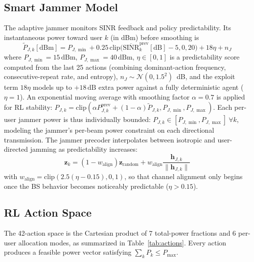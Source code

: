 \documentclass[journal,twocolumn]{IEEEtran}
\newcommand{\vect}[1]{\mathbf{#1}}
\begin{document}
\subsection{Smart Jammer Model}

The adaptive jammer monitors SINR feedback and policy predictability. Its instantaneous power toward user $k$ (in dBm) before smoothing is
\begin{equation}
\tilde{P}_{J,k}[\text{dBm}] = P_{J,\min} + 0.25\,\text{clip}\!\bigl(\overline{\text{SINR}}_k^{\text{prev}}[\text{dB}] - 5, 0, 20\bigr) + 18\eta + n_J
\label{eq:jammer_power}
\end{equation}
where $P_{J,\min}=15\,\text{dBm}$, $P_{J,\max}=40\,\text{dBm}$, $\eta \in [0,1]$ is a predictability score computed from the last 25 actions (combining dominant-action frequency, consecutive-repeat rate, and entropy), $n_J \sim \mathcal{N}(0, 1.5^2)$~dB, and the exploit term $18\eta$ models up to $+18\,\text{dB}$ extra power against a fully deterministic agent ($\eta=1$). An exponential moving average with smoothing factor $\alpha=0.7$ is applied for RL stability: $P_{J,k} = \text{clip}(\alpha P_{J,k}^{\text{prev}} + (1-\alpha)\tilde{P}_{J,k}, P_{J,\min}, P_{J,\max})$. Each per-user jammer power is thus individually bounded: $P_{J,k} \in [P_{J,\min}, P_{J,\max}]\ \forall k$, modeling the jammer's per-beam power constraint on each directional transmission. The jammer precoder interpolates between isotropic and user-directed jamming as predictability increases:
\begin{equation}
\vect{z}_k = (1 - w_{\text{align}})\vect{z}_{\text{random}} + w_{\text{align}}\frac{\vect{h}_{J,k}}{\|\vect{h}_{J,k}\|}
\end{equation}
with $w_{\text{align}} = \text{clip}(2.5(\eta - 0.15), 0, 1)$, so that channel alignment only begins once the BS behavior becomes noticeably predictable ($\eta > 0.15$).

\subsection{RL Action Space}

The 42-action space is the Cartesian product of 7 total-power fractions and 6 per-user allocation modes, as summarized in Table~\ref{tab:actions}. Every action produces a feasible power vector satisfying $\sum_k P_k \leq P_{\max}$.
\end{document}
